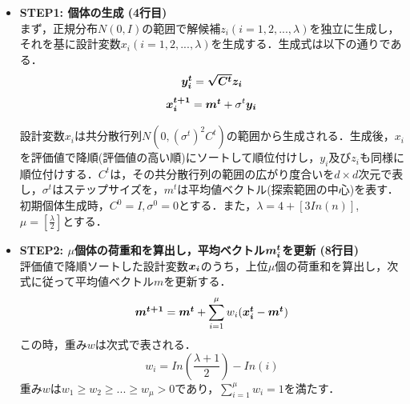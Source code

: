 \documentclass[a4j,11pt]{jarticle}
\begin{document}
\begin{itemize}
\item {\bf STEP1: 個体の生成 (4行目)} 　\\
まず，正規分布$N(0,I)$の範囲で解候補$z_i (i=1,2,...,\lambda)$を独立に生成し，それを基に設計変数$x_i (i=1,2,...,\lambda)$を生成する．生成式は以下の通りである．
\begin{equation}
\label{eq:cmaes-yi}
\mbox{\boldmath $y_i^t$}=\mbox{\boldmath $\sqrt{C^t}z_i$}
\end{equation}
\begin{equation}
\label{eq:cmaes-xi}
\mbox{\boldmath $x_i^{t+1}$}=\mbox{\boldmath $m^t$}+ \sigma ^t \mbox{\boldmath $y_i$}
\end{equation}

設計変数$x_i$は共分散行列$N(0,(\sigma^t)^2 C^t)$の範囲から生成される．生成後，$x_i$を評価値で降順(評価値の高い順)にソートして順位付けし，$y_i$及び$z_i$も同様に順位付けする．$C^t$は，その共分散行列の範囲の広がり度合いを$d \times d$次元で表し，$\sigma^t$はステップサイズを，$m^t$は平均値ベクトル(探索範囲の中心)を表す．初期個体生成時，$C^0=I, \sigma^0=0$とする．また，$\lambda=4+[3In(n)]$, $\mu=[\frac{\lambda}{2}]$とする．

\item {\bf STEP2: $\mu$個体の荷重和を算出し，平均ベクトル$\mbox{\boldmath $m_i^t$}$を更新 (8行目)} \\
評価値で降順ソートした設計変数$\mbox{\boldmath $x_i$}$のうち，上位$\mu$個の荷重和を算出し，次式に従って平均値ベクトル$m$を更新する．
\begin{equation}
\label{eq:cmaes-mi}
\mbox{\boldmath $m^{t+1}$}=\mbox{\boldmath $m^t$}+ \sum_{i=1}^{\mu}w_i(\mbox{\boldmath $x_i^t$}-\mbox{\boldmath $m^t$})
\end{equation}
この時，重み$w$は次式で表される．
\begin{equation}
\label{eq:cmaes-w}
w_i=In(\frac{\lambda+1}{2})-In(i)
\end{equation}
重み$w$は$w_1 \geq w_2 \geq ... \geq w_\mu > 0$であり，$\sum_{i=1}^{\mu}w_i=1$を満たす．


\end{itemize}
\end{document}
